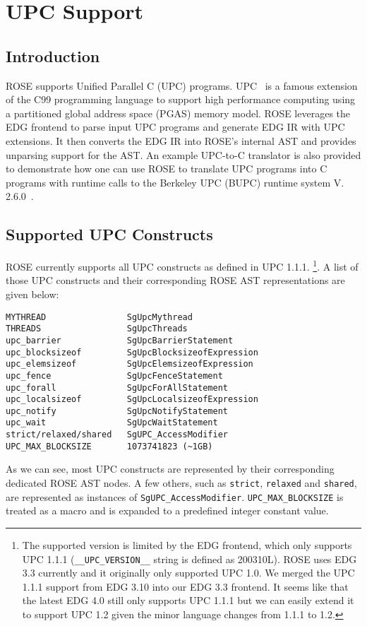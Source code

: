 \chapter{UPC Support}
\label{chap::upcsupport}

\section{Introduction}
ROSE supports Unified Parallel C (UPC) programs.
UPC~\cite{UPC:Web} is a famous extension of the C99 programming language to support high performance computing using a partitioned global address space (PGAS) memory model.
ROSE leverages the EDG frontend to parse input UPC programs and generate EDG IR with UPC extensions.
It then converts the EDG IR into ROSE's internal AST and provides unparsing support for the AST.
An example UPC-to-C translator is also provided to demonstrate how one can use ROSE to 
translate UPC programs into C programs with runtime calls to the Berkeley UPC (BUPC) runtime system V. 2.6.0~\cite{BUPC:Web}.

\section{Supported UPC Constructs}
ROSE currently supports all UPC constructs as defined in UPC 1.1.1.
\footnote{
The supported version is limited by the EDG
frontend, which only supports UPC 1.1.1 (\lstinline{__UPC_VERSION__} string
is defined as 200310L).
ROSE uses EDG 3.3 currently and it originally only supported UPC 1.0. 
We merged the UPC 1.1.1 support from EDG 3.10 into our EDG 3.3 frontend. 
It seems like that the latest EDG 4.0 still only supports UPC 1.1.1 but we
can easily extend it to support UPC 1.2 given the minor language changes
from 1.1.1 to 1.2.}.
A list of those UPC constructs and their corresponding ROSE AST representations are given below:
\begin{verbatim}
MYTHREAD                SgUpcMythread
THREADS                 SgUpcThreads
upc_barrier             SgUpcBarrierStatement
upc_blocksizeof         SgUpcBlocksizeofExpression
upc_elemsizeof          SgUpcElemsizeofExpression
upc_fence               SgUpcFenceStatement
upc_forall              SgUpcForAllStatement
upc_localsizeof         SgUpcLocalsizeofExpression
upc_notify              SgUpcNotifyStatement
upc_wait                SgUpcWaitStatement
strict/relaxed/shared   SgUPC_AccessModifier
UPC_MAX_BLOCKSIZE       1073741823 (~1GB)
\end{verbatim}
As we can see, most UPC constructs are represented by their corresponding dedicated ROSE AST nodes. 
A few others, such as \lstinline{strict}, \lstinline{relaxed} and
\lstinline{shared}, are represented as instances of \lstinline{SgUPC_AccessModifier}.
\lstinline{UPC_MAX_BLOCKSIZE} is treated as a macro and is expanded to a predefined integer constant value.

